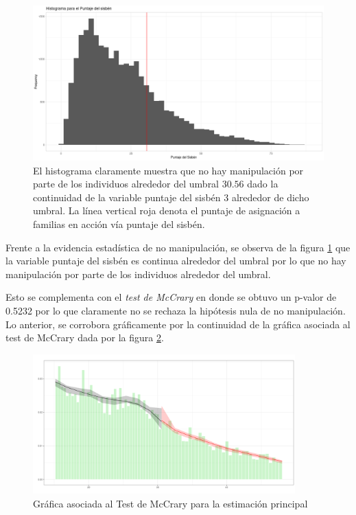 \documentclass[AER]{AEA}
\begin{document}
\begin{figure}[h]
    \centering
    \includegraphics[width = 0.9 \textwidth]{imagenes/estimax_principal/histrograma_puntaje_sisben.png}
    \caption{El histograma claramente muestra que no hay manipulación por parte de los individuos alrededor del umbral $30.56$ dado la continuidad de la variable puntaje del sisbén 3 alrededor de dicho umbral. La línea vertical roja denota el puntaje de asignación a familias en acción vía puntaje del sisbén. }
    \label{fig:histog_completa}
\end{figure}

Frente a la evidencia estadística de no manipulación, se observa de la figura \ref{fig:histog_completa} que la variable puntaje del sisbén es continua alrededor del umbral por lo que no hay manipulación por parte de los individuos alrededor del umbral.

Esto se complementa con el \textit{test de McCrary} en donde se obtuvo un p-valor de 0.5232 por lo que claramente no se rechaza la hipótesis nula de no manipulación. Lo anterior, se corrobora gráficamente por la continuidad de la gráfica asociada al test de McCrary dada por la figura \ref{fig:mccrary_complete}. 

\begin{figure}[h]
    \centering
    \includegraphics[width = 0.9\textwidth]{imagenes/estimax_principal/mccrary_principal.png}
    \caption{Gráfica asociada al Test de McCrary para la estimación principal}
    \label{fig:mccrary_complete}
\end{figure}
\end{document}
